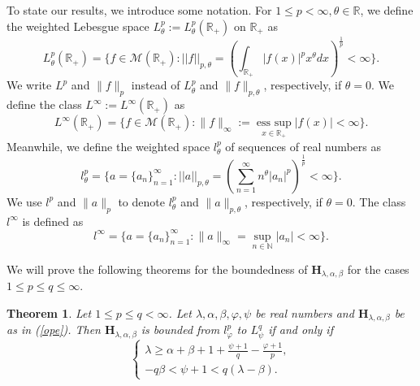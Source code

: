 \documentclass[10pt]{amsart}
\newtheorem{theorem}{Theorem}[section]
\theoremstyle{definition}    %
\numberwithin{equation}{section}
\begin{document}
To state our results, we introduce some notation. For $1\leq p<\infty, \theta\in \mathbb{R}$, we define the weighted Lebesgue space 
$L_{\theta}^p:= L_{\theta}^p(\mathbb{R}_{+})$ on $\mathbb{R}_{+}$ as 
\begin{displaymath} 
L_{\theta}^p(\mathbb{R}_{+})=\{f\in \mathcal{M}(\mathbb{R}_{+}): 
||f||_{p,\theta}=(\int_{\mathbb{R}_{+}} 
|f(x)|^p x^{\theta}dx)^{\frac{1}{p}}<\infty \}. 
\end{displaymath} 
We write $L^p$ and $\|f\|_{p}$ instead of $L_{\theta}^p$ and $\|f\|_{p,\theta}$, respectively, if $\theta=0$. 
We define the class $L^{\infty}:=L^{\infty}(\mathbb{R}_{+})$ as 
\begin{displaymath} 
L^{\infty}(\mathbb{R}_{+})=\{f\in \mathcal{M}(\mathbb{R}_{+}): \|f\|_{\infty}:=\mathop{\text {ess sup}}\limits_{x \in \mathbb{R}_{+}}|f(x)|<\infty\}.
\end{displaymath}
Meanwhile, we define the weighted space $l_{\theta}^p$ of sequences of real numbers as 
\begin{displaymath} 
l_{\theta}^p=\{a=\{a_n\}_{n=1}^{\infty}: ||a||_{p,\theta}=(\sum_{n=1}^{\infty}n^{\theta}|a_n|^p)^{\frac{1}{p}}<\infty \}. 
\end{displaymath} 
We use $l^p$ and $\|a\|_{p}$ to denote $l_{\theta}^p$ and $\|a\|_{p,\theta}$, respectively, if $\theta=0$. The class $l^{\infty}$ is defined as 
\begin{displaymath} 
l^{\infty}=\{a=\{a_n\}_{n=1}^{\infty}: \|a\|_{\infty}=\sup\limits_{n \in \mathbb{N}}|a_n|<\infty\}.
\end{displaymath} 

We will prove the following theorems for the boundedness of $\mathbf{H}_{\lambda, \alpha, \beta}$ for the cases $1\leq p\leq q \leq \infty$. 

\begin{theorem}\label{m-th-1}
Let $1\leq p\leq q<\infty$. Let $\lambda, \alpha, \beta, \varphi, \psi$ be real numbers and $\mathbf{H}_{\lambda, \alpha, \beta}$ be as in (\ref{ope}). Then $\mathbf{H}_{\lambda, \alpha, \beta}$ is bounded from
$l_{\varphi}^p$ to $L_{\psi}^q$ if and only if 
\begin{equation} 
\begin{cases}
\lambda\geq \alpha+\beta+1+\frac{\psi+1}{q}-\frac{\varphi+1}{p}, \\
-q\beta<\psi+1<q(\lambda-\beta). \nonumber 
\end{cases}
\end{equation}
\end{theorem}
\end{document}
